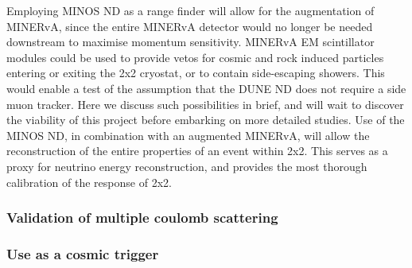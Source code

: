 Employing MINOS ND as a range finder will allow for the augmentation of MINERvA, since the entire MINERvA detector would no longer be needed downstream to maximise momentum sensitivity.
MINERvA EM scintillator modules could be used to provide vetos for cosmic and rock induced particles entering or exiting the 2x2 cryostat, or to contain side-escaping showers. 
This would enable a test of the assumption that the DUNE ND does not require a side muon tracker. 
Here we discuss such possibilities in brief, and will wait to discover the viability of this project before embarking on more detailed studies.
Use of the MINOS ND, in combination with an augmented MINERvA, will allow the reconstruction of the entire properties of an event within 2x2.
This serves as a proxy for neutrino energy reconstruction, and provides the most thorough calibration of the response of 2x2.  

\subsubsection{Validation of multiple coulomb scattering}

\subsubsection{Use as a cosmic trigger}
